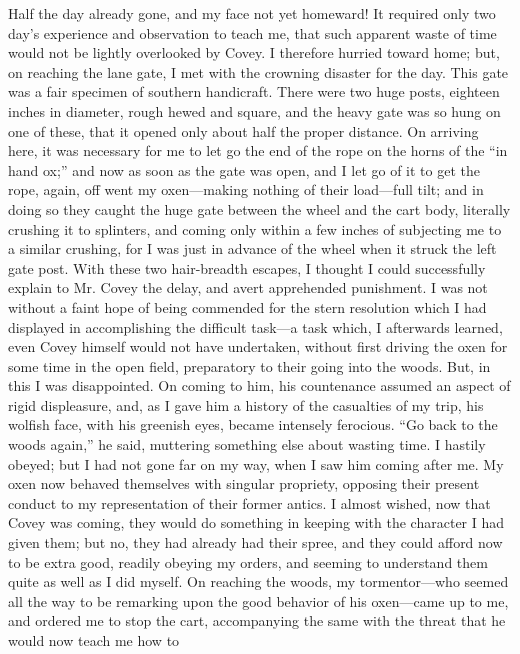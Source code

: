 Half the day already gone, and my face not yet homeward! It required
only two day's experience and observation to teach me, that such
apparent waste of time would not be lightly overlooked by Covey. I
therefore hurried toward home; but, on reaching the lane gate, I met
with the crowning disaster for the day. This gate was a fair specimen of
southern handicraft. There were two huge posts, eighteen inches in
diameter, rough hewed and square, and the heavy gate was so hung on one
of these, that it opened only about half the proper distance. On
{\protect\hypertarget{213}{}{}}arriving here, it was necessary for me to
let go the end of the rope on the horns of the ``in hand ox;'' and now
as soon as the gate was open, and I let go of it to get the rope, again,
off went my oxen---making nothing of their load---full tilt; and in
doing so they caught the huge gate between the wheel and the cart body,
literally crushing it to splinters, and coming only within a few inches
of subjecting me to a similar crushing, for I was just in advance of the
wheel when it struck the left gate post. With these two hair-breadth
escapes, I thought I could successfully explain to Mr. Covey the delay,
and avert apprehended punishment. I was not without a faint hope of
being commended for the stern resolution which I had displayed in
accomplishing the difficult task---a task which, I afterwards learned,
even Covey himself would not have undertaken, without first driving the
oxen for some time in the open field, preparatory to their going into
the woods. But, in this I was disappointed. On coming to him, his
countenance assumed an aspect of rigid displeasure, and, as I gave him a
history of the casualties of my trip, his wolfish face, with his
greenish eyes, became intensely ferocious. ``Go back to the woods
again,'' he said, muttering something else about wasting time. I hastily
obeyed; but I had not gone far on my way, when I saw him coming after
me. My oxen now behaved themselves with singular propriety, opposing
their present conduct to my representation of their former antics. I
almost wished, now that Covey was coming, they would do something in
keeping with the character I had given them; but no, they had already
{\protect\hypertarget{214}{}{}}had their spree, and they could afford
now to be extra good, readily obeying my orders, and seeming to
understand them quite as well as I did myself. On reaching the woods, my
tormentor---who seemed all the way to be remarking upon the good
behavior of his oxen---came up to me, and ordered me to stop the cart,
accompanying the same with the threat that he would now teach me how to

